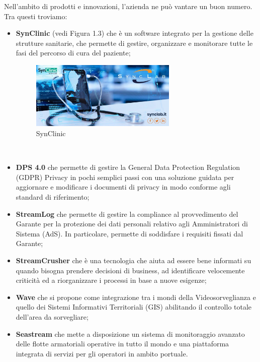 Nell'ambito di prodotti e innovazioni, l'azienda ne può vantare un buon numero.
Tra questi troviamo: 
\begin{itemize}
	\item \textbf{SynClinic} (vedi Figura 1.3) che è un  software integrato per la gestione delle strutture sanitarie, che permette di gestire, organizzare e monitorare tutte le fasi del percorso di cura del paziente; \\
	\begin{figure}[htbp]	
		\centering
		\includegraphics[width=7cm]{immagini/synClinic.jpg}
		\caption{SynClinic}
		\label{fig:SynClinic}
	\end{figure}
	\\
	\item \textbf{DPS 4.0} che permette di gestire la General Data Protection Regulation (GDPR) Privacy in pochi semplici passi con una soluzione guidata per aggiornare e modificare i documenti di privacy in modo conforme agli standard di riferimento; \\
	\item \textbf{StreamLog} che permette di gestire la compliance al provvedimento del Garante per la protezione dei dati personali relativo agli Amministratori di Sistema (AdS). In particolare, permette di soddisfare i requisiti fissati dal Garante; \\
	\item \textbf{StreamCrusher} che è una tecnologia che aiuta ad essere bene informati su quando bisogna prendere decisioni di business, ad identificare velocemente criticità ed a riorganizzare i processi in base a nuove esigenze; \\
	\item \textbf{Wave} che si propone come integrazione tra i mondi della Videosorveglianza e quello dei Sistemi Informativi Territoriali (GIS) abilitando il controllo totale dell'area da sorvegliare; \\
	\item \textbf{Seastream} che mette a disposizione un sistema di monitoraggio avanzato delle flotte armatoriali operative in tutto il mondo e una piattaforma integrata di servizi per gli operatori in ambito portuale. \\
\end{itemize}




